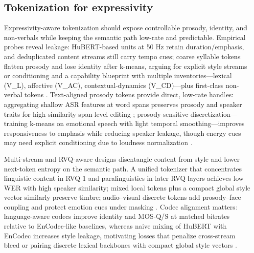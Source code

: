\documentclass{article}
\begin{document}
\subsection{Tokenization for expressivity} \label{subsec:Tokenization for expressivity}
Expressivity-aware tokenization should expose controllable prosody, identity, and non-verbals while keeping the semantic path low-rate and predictable. Empirical probes reveal leakage: HuBERT-based units at 50 Hz retain duration/emphasis, and deduplicated content streams still carry tempo cues; coarse syllable tokens flatten prosody and lose identity after k-means, arguing for explicit style streams or conditioning and a capability blueprint with multiple inventories---lexical (V\_L), affective (V\_{AC}), contextual-dynamics (V\_{CD})---plus first-class non-verbal tokens \cite{peng2024empiricalstudyspeechlanguagemodelsprompt,wang2025bossbeyondsemanticspeech}. Text-aligned prosody tokens provide direct, low-rate handles: aggregating shallow ASR features at word spans preserves prosody and speaker traits for high-similarity span-level editing \cite{tseng2025tastetextalignedspeechtokenizationembedd}; prosody-sensitive discretization---training k-means on emotional speech with light temporal smoothing---improves responsiveness to emphasis while reducing speaker leakage, though energy cues may need explicit conditioning due to loudness normalization \cite{onda2025benchmarkingprosodyencodingdiscretespeec}.

Multi-stream and RVQ-aware designs disentangle content from style and lower next-token entropy on the semantic path. A unified tokenizer that concentrates linguistic content in RVQ-1 and paralinguistics in later RVQ layers achieves low WER with high speaker similarity; mixed local tokens plus a compact global style vector similarly preserve timbre; audio--visual discrete tokens add prosody--face coupling and protect emotion cues under masking \cite{zhang2024speechtokenizerunifiedspeechtokenizerlar,messica2024nastnoiseawarespeechtokenizationlanguage,sadok2025vectorquantizedmaskedautoencoderaudiovis}. Codec alignment matters: language-aware codecs improve identity and MOS-Q/S at matched bitrates relative to EnCodec-like baselines, whereas naive mixing of HuBERT with EnCodec increases style leakage, motivating losses that penalize cross-stream bleed or pairing discrete lexical backbones with compact global style vectors \cite{ji2025languagecodecbridgingdiscreterepresentat,peng2024empiricalstudyspeechlanguagemodelsprompt}. 
\end{document}
